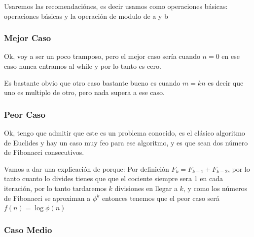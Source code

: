 \documentclass[12pt, fleqn]{article}                            %
\theoremstyle{break}                                            %
\begin{document}
        Usaremos las recomendaciónes, es decir usamos como operaciones básicas:
        operaciones básicas y la operación de modulo de a y b


        \subsubsection{Mejor Caso}

            Ok, voy a ser un poco tramposo, pero el mejor caso sería cuando $n = 0$
            en ese caso nunca entramos al while y por lo tanto es cero.

            Es bastante obvio que otro caso bastante bueno es cuando $ m = kn$ es decir
            que uno es multiplo de otro, pero nada supera a ese caso.


        \subsubsection{Peor Caso}


            Ok, tengo que admitir que este es un problema conocido, es el clásico algoritmo de Euclides
            y hay un caso muy feo para ese algoritmo, y es que sean dos número de Fibonacci consecutivos.

            Vamos a dar una explicación de porque:
            Por definición $F_{k} = F_{k -1} + F_{k - 2}$, por lo tanto cuanto lo divides tienes que 
            que el cociente siempre sera 1 en cada iteración, por lo tanto tardaremos $k$ divisiones en 
            llegar a $k$, y como los números de Fibonacci se aproximan a $\phi^k$ entonces
            tenemos que el peor caso será $f(n) = \log{\phi}(n)$



        \subsubsection{Caso Medio}
\end{document}
